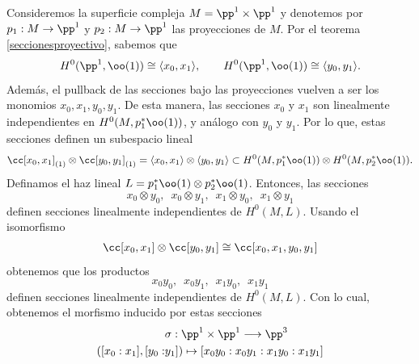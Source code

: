 	\begin{example}
		Consideremos la superficie compleja $M=\pp^1\times\pp^1$ y denotemos por $p_1:M\to \pp^1$ y $p_2:M\to \pp^1$ las proyecciones de $M$. Por el teorema \ref{seccionesproyectivo}, sabemos que
		\begin{equation*}
			H^0(\pp^1,\oo(1))\cong\langle x_0,x_1\rangle, \qquad H^0(\pp^1,\oo(1))\cong\langle y_0,y_1\rangle.
		\end{equation*}
		Además, el pullback de las secciones bajo las proyecciones vuelven a ser los monomios $x_0,x_1,y_0,y_1$. De esta manera, las secciones $x_0$ y $x_1$ son linealmente independientes en $H^0(M,p_1^*\oo(1))$, y análogo con $y_0$ y $y_1$. Por lo que, estas secciones definen un subespacio lineal
		\begin{equation*}
			\cc[x_0,x_1]_{(1)}\otimes \cc[y_0,y_1]_{(1)}=\langle x_0,x_1\rangle\otimes \langle y_0,y_1\rangle\subset H^0(M,p_1^*\oo(1))\otimes H^0(M,p_2^*\oo(1)).
		\end{equation*}
		Definamos el haz lineal $L=p_1^*\oo(1)\otimes p_2^*\oo(1)$. Entonces, las secciones
		\begin{equation*}
			x_0\otimes y_0,\enspace x_0\otimes y_1,\enspace x_1\otimes y_0,\enspace x_1\otimes y_1
		\end{equation*}
		definen secciones linealmente independientes de $H^0(M,L)$. Usando el isomorfismo
		\begin{align*}
			\cc[x_0,x_1]\otimes \cc[y_0,y_1]\cong \cc[x_0,x_1,y_0,y_1]
		\end{align*}
		obtenemos que los productos 
		\begin{equation*}
			x_0y_0,\enspace x_0y_1,\enspace x_1y_0,\enspace x_1y_1
		\end{equation*}
		definen secciones linealmente independientes de $H^0(M,L)$. Con lo cual, obtenemos el morfismo inducido por estas secciones
		\begin{align*}
				&\sigma:\pp^1\times\pp^1\longrightarrow \pp^3\\
			([x_0:x_1],[y_0:&y_1])\mapsto [x_0y_0:x_0y_1:x_1y_0:x_1y_1]
		\end{align*}


\end{example}
